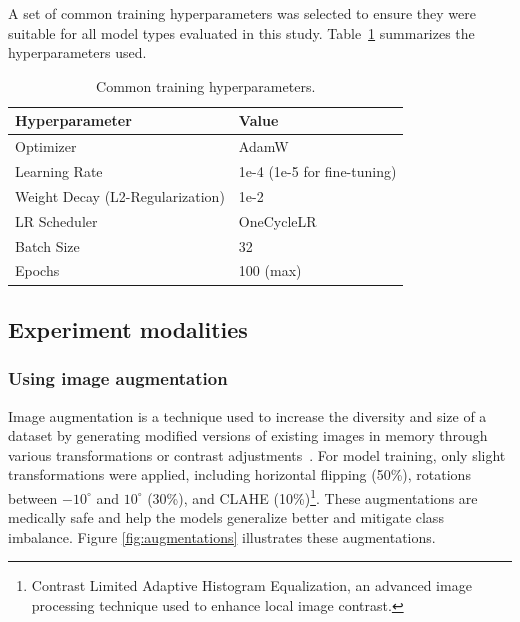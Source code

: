 \documentclass[a4paper,10pt]{book}
\begin{document}
A set of common training hyperparameters was selected to ensure they were suitable for all model types evaluated in this study. Table~\ref{tab:hyperparams} summarizes the hyperparameters used.


\begin{table}[h!]
    \caption[Common training hyperparameters]{Common training hyperparameters.}
    \centering
    \begin{tabular}{l l}
        \toprule
        \textbf{Hyperparameter} & \textbf{Value} \\
        \midrule
        Optimizer  & AdamW \\

        Learning Rate  & 1e-4 (1e-5 for fine-tuning) \\
 
        Weight Decay (L2-Regularization) & 1e-2 \\

        LR Scheduler & OneCycleLR \\
   
        Batch Size & 32 \\

        Epochs & 100 (max) \\
        \bottomrule
    \end{tabular}
    \label{tab:hyperparams}
\end{table}

\subsection{Experiment modalities}

\subsubsection{Using image augmentation}

Image augmentation is a technique used to increase the diversity and size of a dataset by generating modified versions of existing images in memory through various transformations or contrast adjustments~\cite{noauthor_complete_nodate}. For model training, only slight transformations were applied, including horizontal flipping (50\%), rotations between $-10^\circ$ and $10^\circ$ (30\%), and CLAHE (10\%)\footnote{Contrast Limited Adaptive Histogram Equalization, an advanced image processing technique used to enhance local image contrast.}. These augmentations are medically safe and help the models generalize better and mitigate class imbalance. Figure \ref{fig:augmentations} illustrates these augmentations.
\end{document}
